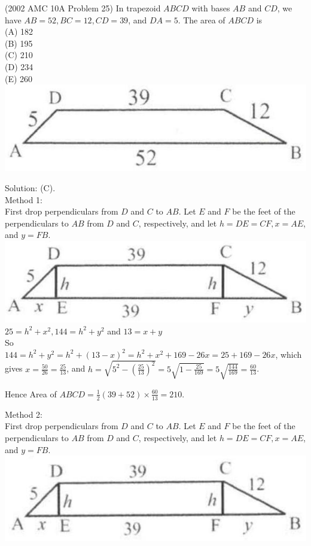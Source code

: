 \documentclass{article}
\begin{document}
(2002 AMC 10A Problem 25) In trapezoid \(A B C D\) with bases \(A B\) and \(C D\), we have \(A B=52, B C=12, C D=39\), and \(D A=5\). The area of \(A B C D\) is\\
(A) 182\\
(B) 195\\
(C) 210\\
(D) 234\\
(E) 260\\
\centering
\includegraphics[width=\textwidth]{images/077(1).jpg}

Solution: (C).\\
Method 1:\\
First drop perpendiculars from \(D\) and \(C\) to \(A B\). Let \(E\) and \(F\) be the feet of the perpendiculars to \(A B\) from \(D\) and \(C\), respectively, and let \(h=D E=C F, x=A E\), and \(y=F B\).\\
\centering
\includegraphics[width=\textwidth]{images/077.jpg}\\
\(25=h^{2}+x^{2}, 144=h^{2}+y^{2}\) and \(13=x+y\)\\
So\\
\(144=h^{2}+y^{2}=h^{2}+(13-x)^{2}=h^{2}+x^{2}+169-26 x=25+169-26 x\), which gives \(x=\frac{50}{26}=\frac{25}{13}\), and \(h=\sqrt{5^{2}-\left(\frac{25}{13}\right)^{2}}=5 \sqrt{1-\frac{25}{169}}=5 \sqrt{\frac{144}{169}}=\frac{60}{13}\).


Hence Area of \(A B C D=\frac{1}{2}(39+52) \times \frac{60}{13}=210\).

Method 2:\\
First drop perpendiculars from \(D\) and \(C\) to \(A B\). Let \(E\) and \(F\) be the feet of the perpendiculars to \(A B\) from \(D\) and \(C\), respectively, and let \(h=D E=C F, x=A E\), and \(y=F B\).\\
\centering
\includegraphics[width=\textwidth]{images/078(1).jpg}
\end{document}
